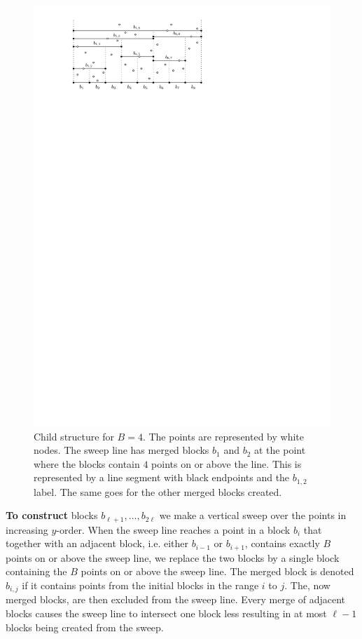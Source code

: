 \documentclass[twoside,11pt,openright]{report}
\begin{document}
\begin{figure}[h]
	\centering
	\includegraphics[scale=1]{../figures/sweep-line}
	\caption{Child structure for $B=4$. The points are represented by white nodes. The sweep line has merged blocks $b_1$ and $b_2$ at the point where the blocks contain $4$ points on or above the line. This is represented by a line segment with black endpoints and the $b_{1,2}$ label. The same goes for the other merged blocks created.}
	\label{fig:sweep-line}
\end{figure}

\textbf{To construct} blocks $b_{\ell+1},\dots,b_{2\ell}$ we make a vertical sweep over the points in increasing $y$-order. When the sweep line reaches a point in a block $b_i$ that together with an adjacent block, i.e. either $b_{i-1}$ or $b_{i+1}$, contains exactly $B$ points on or above the sweep line, we replace the two blocks by a single block containing the $B$ points on or above the sweep line.  The merged block is denoted $b_{i,j}$ if it contains points from the initial blocks in the range $i$ to $j$. The, now merged blocks, are then excluded from the sweep line. Every merge of adjacent blocks causes the sweep line to intersect one block less resulting in at most $\ell-1$ blocks being created from the sweep.
\end{document}
